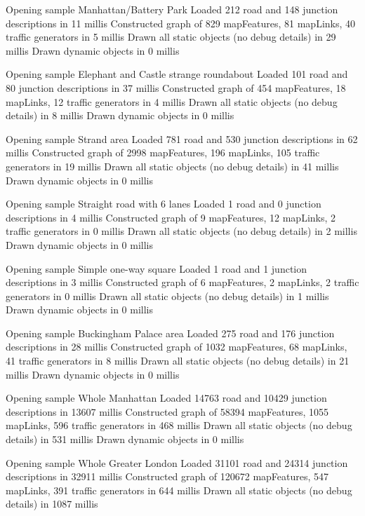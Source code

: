Opening sample Manhattan/Battery Park
Loaded 212 road and 148 junction descriptions in 11 millis
Constructed graph of 829 mapFeatures, 81 mapLinks, 40 traffic generators in 5 millis
Drawn all static objects (no debug details) in 29 millis
Drawn dynamic objects in 0 millis

Opening sample Elephant and Castle strange roundabout
Loaded 101 road and 80 junction descriptions in 37 millis
Constructed graph of 454 mapFeatures, 18 mapLinks, 12 traffic generators in 4 millis
Drawn all static objects (no debug details) in 8 millis
Drawn dynamic objects in 0 millis


Opening sample Strand area
Loaded 781 road and 530 junction descriptions in 62 millis
Constructed graph of 2998 mapFeatures, 196 mapLinks, 105 traffic generators in 19 millis
Drawn all static objects (no debug details) in 41 millis
Drawn dynamic objects in 0 millis


Opening sample Straight road with 6 lanes
Loaded 1 road and 0 junction descriptions in 4 millis
Constructed graph of 9 mapFeatures, 12 mapLinks, 2 traffic generators in 0 millis
Drawn all static objects (no debug details) in 2 millis
Drawn dynamic objects in 0 millis

Opening sample Simple one-way square
Loaded 1 road and 1 junction descriptions in 3 millis
Constructed graph of 6 mapFeatures, 2 mapLinks, 2 traffic generators in 0 millis
Drawn all static objects (no debug details) in 1 millis
Drawn dynamic objects in 0 millis

Opening sample Buckingham Palace area
Loaded 275 road and 176 junction descriptions in 28 millis
Constructed graph of 1032 mapFeatures, 68 mapLinks, 41 traffic generators in 8 millis
Drawn all static objects (no debug details) in 21 millis
Drawn dynamic objects in 0 millis

Opening sample Whole Manhattan
Loaded 14763 road and 10429 junction descriptions in 13607 millis
Constructed graph of 58394 mapFeatures, 1055 mapLinks, 596 traffic generators in 468 millis
Drawn all static objects (no debug details) in 531 millis
Drawn dynamic objects in 0 millis

Opening sample Whole Greater London
Loaded 31101 road and 24314 junction descriptions in 32911 millis
Constructed graph of 120672 mapFeatures, 547 mapLinks, 391 traffic generators in 644 millis
Drawn all static objects (no debug details) in 1087 millis


